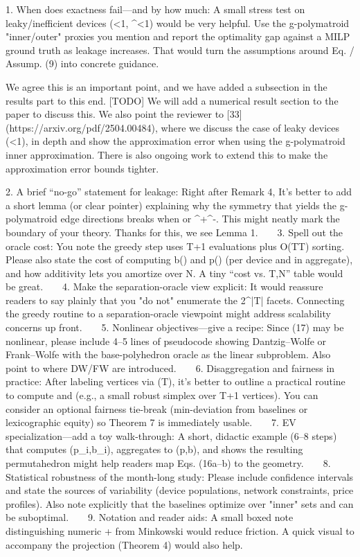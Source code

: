 1. When does exactness fail—and by how much: A small stress test on leaky/inefficient devices (\lambda<1, \eta^\pm<1) would be very helpful. Use the g-polymatroid "inner/outer" proxies you mention and report the optimality gap against a MILP ground truth as leakage increases. That would turn the assumptions around Eq. / Assump. (9) into concrete guidance.

We agree this is an important point, and we have added a subsection in the results part to this end. 
[TODO] We will add a numerical result section to the paper to discuss this.
We also point the reviewer to [33] (https://arxiv.org/pdf/2504.00484), where we discuss the case of leaky devices (\lambda<1), in depth and show the approximation error when using the g-polymatroid inner approximation.
There is also ongoing work to extend this to make the approximation error bounds tighter.

2. A brief “no-go” statement for leakage: Right after Remark 4, It's better to add a short lemma (or clear pointer) explaining why the symmetry that yields the g-polymatroid edge directions breaks when \lambda{} or \eta^+\neq\eta^-. This might neatly mark the boundary of your theory.
Thanks for this, we see Lemma 1.
   
3. Spell out the oracle cost: You note the greedy step uses T{+}1 evaluations plus O(T\log T) sorting. Please also state the cost of computing b(\cdot) and p(\cdot) (per device and in aggregate), and how additivity lets you amortize over N. A tiny “cost vs. T,N” table would be great.
   
4. Make the separation-oracle view explicit: It would reassure readers to say plainly that you "do not" enumerate the 2^{|T|} facets. Connecting the greedy routine to a separation-oracle viewpoint might address scalability concerns up front.
   
5. Nonlinear objectives—give a recipe: Since (17) may be nonlinear, please include 4–5 lines of pseudocode showing Dantzig–Wolfe or Frank–Wolfe with the base-polyhedron oracle as the linear subproblem. Also point to where DW/FW are introduced.
   
6. Disaggregation and fairness in practice: After labeling vertices via (\tilde T), it's better to outline a practical routine to compute \lambda and \Pi (e.g., a small robust simplex over T{+}1 vertices). You can consider an optional fairness tie-break (min-deviation from baselines or lexicographic equity) so Theorem 7 is immediately usable.
   
7. EV specialization—add a toy walk-through: A short, didactic example (6–8 steps) that computes (p_i,b_i), aggregates to (p,b), and shows the resulting permutahedron might help readers map Eqs. (16a–b) to the geometry.
   
8. Statistical robustness of the month-long study: Please include confidence intervals and state the sources of variability (device populations, network constraints, price profiles). Also note explicitly that the baselines optimize over "inner" sets and can be suboptimal.
   
9. Notation and reader aids: A small boxed note distinguishing numeric + from Minkowski \oplus would reduce friction. A quick visual to accompany the projection (Theorem 4) would also help.


